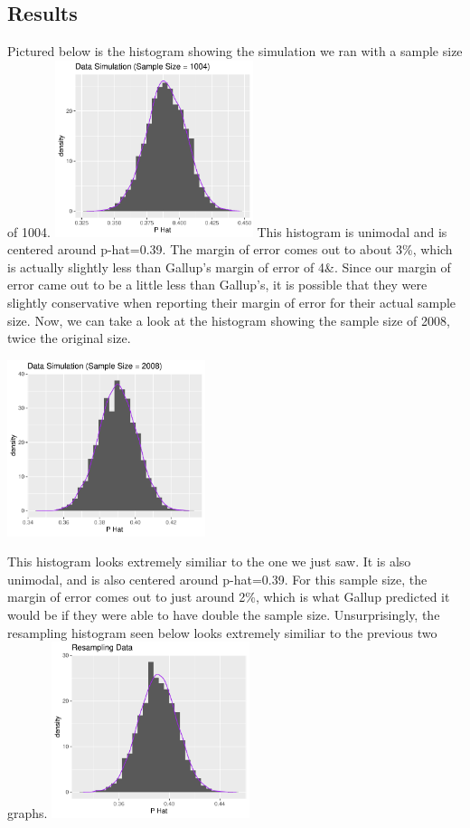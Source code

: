 \documentclass{article}\usepackage[]{graphicx}\usepackage[]{xcolor}
\begin{document}
\begin{multicols}{2}
\section{Results}
Pictured below is the histogram showing the simulation we ran with a sample size of 1004.
\includegraphics[width=0.435\textwidth]{hhhh.pdf}
\indent 
This histogram is unimodal and is centered around p-hat=0.39. The margin of error comes out to about 3\%, which is actually slightly less than Gallup's margin of error of 4\&. Since our margin of error came out to be a little less than Gallup's, it is possible that they were slightly conservative when reporting their margin of error for their actual sample size.
\newline
\indent 
Now, we can take a look at the histogram showing the sample size of 2008, twice the original size.
\begin{center}
  \includegraphics[width=0.435\textwidth]{2008sample.pdf}
\end{center}
\indent 
This histogram looks extremely similiar to the one we just saw. It is also unimodal, and is also centered around p-hat=0.39. For this sample size, the margin of error comes out to just around 2\%, which is what Gallup predicted it would be if they were able to have double the sample size.
\newline
\indent
Unsurprisingly, the resampling histogram seen below looks extremely similiar to the previous two graphs.
\includegraphics[width=0.435\textwidth]{resampling.pdf}

\end{multicols}
\end{document}
